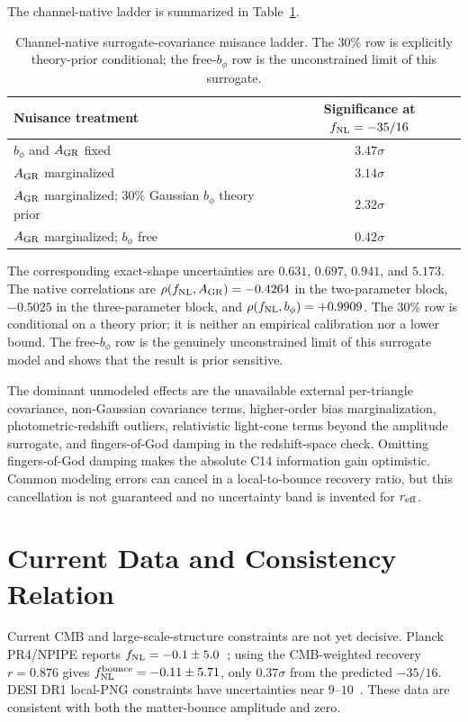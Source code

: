 \documentclass[aps,prd,twocolumn,superscriptaddress,showpacs,preprintnumbers,nofootinbib,longbibliography,floatfix]{revtex4-2}
\newcommand{\fnl}{f_{\rm NL}}
\begin{document}
The channel-native ladder is summarized in Table~\ref{tab:nuisance-ladder}.
\begin{table}[t]
\centering
\caption{Channel-native surrogate-covariance nuisance ladder. The 30\% row is explicitly theory-prior conditional; the free-$b_\phi$ row is the unconstrained limit of this surrogate.}
\label{tab:nuisance-ladder}
\begin{tabular}{lc}
\toprule
Nuisance treatment & Significance at $\fnl=-35/16$ \\
\midrule
$b_\phi$ and $A_{\rm GR}$ fixed & $3.47\sigma$ \\
$A_{\rm GR}$ marginalized & $3.14\sigma$ \\
$A_{\rm GR}$ marginalized; 30\% Gaussian $b_\phi$ theory prior & $2.32\sigma$ \\
$A_{\rm GR}$ marginalized; $b_\phi$ free & $0.42\sigma$ \\
\bottomrule
\end{tabular}
\end{table}
The corresponding exact-shape uncertainties are $0.631$, $0.697$, $0.941$, and $5.173$. The native correlations are $\rho(\fnl,A_{\rm GR})=-0.4264$ in the two-parameter block, $-0.5025$ in the three-parameter block, and $\rho(\fnl,b_\phi)=+0.9909$. The 30\% row is conditional on a theory prior; it is neither an empirical calibration nor a lower bound. The free-$b_\phi$ row is the genuinely unconstrained limit of this surrogate model and shows that the result is prior sensitive.

The dominant unmodeled effects are the unavailable external per-triangle covariance, non-Gaussian covariance terms, higher-order bias marginalization, photometric-redshift outliers, relativistic light-cone terms beyond the amplitude surrogate, and fingers-of-God damping in the redshift-space check. Omitting fingers-of-God damping makes the absolute C14 information gain optimistic. Common modeling errors can cancel in a local-to-bounce recovery ratio, but this cancellation is not guaranteed and no uncertainty band is invented for $r_{\rm eff}$.

\section{Current Data and Consistency Relation}
\label{sec:currentdata}

Current CMB and large-scale-structure constraints are not yet decisive. Planck PR4/NPIPE reports $\fnl=-0.1\pm5.0$~\cite{Jung2025PlanckPR4fNL}; using the CMB-weighted recovery $r=0.876$ gives $\fnl^{\rm bounce}=-0.11\pm5.71$, only $0.37\sigma$ from the predicted $-35/16$. DESI DR1 local-PNG constraints have uncertainties near $9$--$10$~\cite{Chaussidon2024DESIDR1fNL,Fondi2025DESIQSOassembly}. These data are consistent with both the matter-bounce amplitude and zero.
\end{document}
